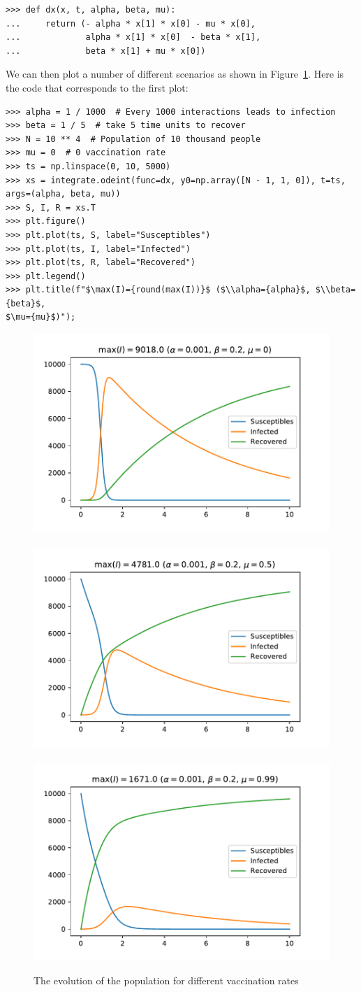 \documentclass[a4paper]{article}
\begin{document}
\begin{verbatim}
>>> def dx(x, t, alpha, beta, mu):
...     return (- alpha * x[1] * x[0] - mu * x[0],
...             alpha * x[1] * x[0]  - beta * x[1],
...             beta * x[1] + mu * x[0])
\end{verbatim}

We can then plot a number of different scenarios as shown in
Figure~\ref{fig:scenarios}. Here is the code that corresponds to the first plot:

\begin{verbatim}
>>> alpha = 1 / 1000  # Every 1000 interactions leads to infection
>>> beta = 1 / 5  # take 5 time units to recover
>>> N = 10 ** 4  # Population of 10 thousand people
>>> mu = 0  # 0 vaccination rate
>>> ts = np.linspace(0, 10, 5000)
>>> xs = integrate.odeint(func=dx, y0=np.array([N - 1, 1, 0]), t=ts, args=(alpha, beta, mu))
>>> S, I, R = xs.T
>>> plt.figure()
>>> plt.plot(ts, S, label="Susceptibles")
>>> plt.plot(ts, I, label="Infected")
>>> plt.plot(ts, R, label="Recovered")
>>> plt.legend()
>>> plt.title(f"$\max(I)={round(max(I))}$ ($\\alpha={alpha}$, $\\beta={beta}$,
$\mu={mu}$)");
\end{verbatim}

\begin{figure}[!hbtp]
    \begin{center}
        \includegraphics[width=.3\textwidth]{base_scenario.pdf}
        ~
        \includegraphics[width=.3\textwidth]{moderate_vaccination_rate.pdf}
        ~
        \includegraphics[width=.3\textwidth]{high_vaccination_rate.pdf}
        \caption{The evolution of the population for different vaccination rates}
        \label{fig:scenarios}
    \end{center}
\end{figure}
\end{document}
